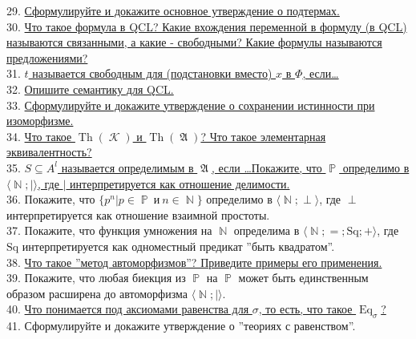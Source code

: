 \documentclass[a4paper,100pt]{article}
\theoremstyle{indented}
\theoremstyle{definition}
\theoremstyle{remark}
\DeclareMathOperator{\NN}{\mathbb{N}}
\DeclareMathOperator{\PP}{\mathbb{P}}
\DeclareMathOperator{\KK}{\mathscr{K}}
\DeclareMathOperator{\Th}{Th}
\DeclareMathOperator{\Eq}{Eq}
\DeclareMathOperator{\GA}{\mathfrak{A}}
\begin{document}
29. \hyperlink{b29}{Сформулируйте и докажите основное утверждение о подтермах.} \\ 

30. \hyperlink{b30}{Что такое формула в QCL? Какие вхождения переменной в формулу (в QCL) называются связанными, а какие - свободными? Какие формулы называются предложениями?} \\

31. \hyperlink{b31}{$t$ называется свободным для (подстановки вместо) $x$ в $\Phi$, если\dots} \\

32. \hyperlink{b32}{Опишите семантику для QCL.} \\ 

33. \hyperlink{b33}{Сформулируйте и докажите утверждение о сохранении истинности при изоморфизме.} \\ 

34. \hyperlink{b34}{Что такое $\Th(\KK)$ и $\Th(\GA)$? Что такое элементарная эквивалентность?} \\ 

35. \hyperlink{b35}{$S \subseteq A^l$ называется определимым в $\GA$, если \dots Покажите, что $\PP$ определимо в $\langle \NN; | \rangle$, где $|$ интерпретируется как отношение делимости.} \\ 

36. %
{Покажите, что $\{p^n| p\in \PP \: и \: n \in \NN\}$ определимо в $\langle \NN; \perp \rangle$, где $\perp$ интерпретируется как отношение взаимной простоты.} \\

37. %
{Покажите, что функция умножения на $\NN$ определима в $\langle \NN; =; \text{Sq}; + \rangle$, где $\text{Sq}$ интерпретируется как одноместный предикат ''быть квадратом''.} \\

38. \hyperlink{b38}{Что такое ''метод автоморфизмов''? Приведите примеры его применения.} \\

39. %
{Покажите, что любая биекция из $\PP$ на $\PP$ может быть единственным образом расширена до автоморфизма $\langle \NN; | \rangle$.} \\

40. \hyperlink{b40}{Что понимается под аксиомами равенства для $\sigma$, то есть, что такое $\Eq_\sigma$?} \\ 

41. %
{Сформулируйте и докажите утверждение о ''теориях с равенством''.} \\ 
\end{document}
